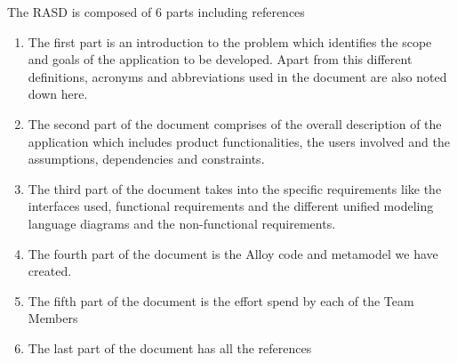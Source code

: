 \qquad The RASD is composed of 6 parts including references
\begin{enumerate}
\item The first part is an introduction to the problem which identifies the scope and goals of the application to be developed. Apart from this different definitions, acronyms and abbreviations used in the document are also noted down here.
\item The second part of the document comprises of the overall description of the application which includes product functionalities, the users involved and the assumptions, dependencies and constraints.
\item The third part of the document takes into the specific requirements like the interfaces used, functional requirements and the different unified modeling language diagrams and the non-functional requirements.
\item The fourth part of the document is the Alloy code and metamodel we have created.
\item The fifth part of the document is the effort spend by each of the Team Members
\item The last part of the document has all the references
\end{enumerate}
